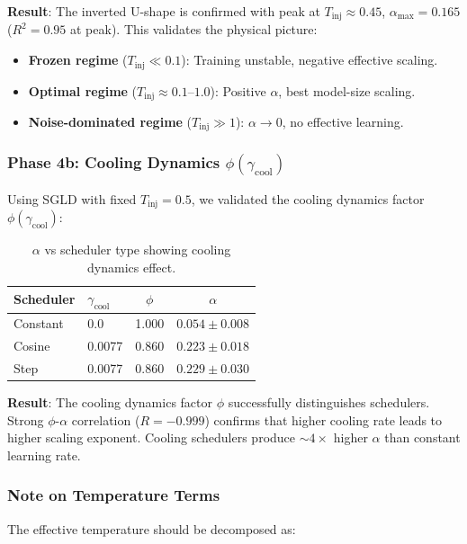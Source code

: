 \documentclass[11pt, a4paper]{article}
\theoremstyle{definition}
\begin{document}
\textbf{Result}: The inverted U-shape is confirmed with peak at $T_{\text{inj}} \approx 0.45$, $\alpha_{\text{max}} = 0.165$ ($R^2 = 0.95$ at peak). This validates the physical picture:
\begin{itemize}
    \item \textbf{Frozen regime} ($T_{\text{inj}} \ll 0.1$): Training unstable, negative effective scaling.
    \item \textbf{Optimal regime} ($T_{\text{inj}} \approx 0.1$--$1.0$): Positive $\alpha$, best model-size scaling.
    \item \textbf{Noise-dominated regime} ($T_{\text{inj}} \gg 1$): $\alpha \to 0$, no effective learning.
\end{itemize}

\subsubsection{Phase 4b: Cooling Dynamics $\phi(\gamma_{\text{cool}})$}

Using SGLD with fixed $T_{\text{inj}} = 0.5$, we validated the cooling dynamics factor $\phi(\gamma_{\text{cool}})$:

\begin{table}[htbp]
\centering
\caption{$\alpha$ vs scheduler type showing cooling dynamics effect.}
\label{tab:cool_scaling}
\begin{tabular}{@{}llcc@{}}
\toprule
\textbf{Scheduler} & $\gamma_{\text{cool}}$ & $\phi$ & $\alpha$ \\
\midrule
Constant & 0.0 & 1.000 & $0.054 \pm 0.008$ \\
Cosine & 0.0077 & 0.860 & $0.223 \pm 0.018$ \\
Step & 0.0077 & 0.860 & $0.229 \pm 0.030$ \\
\bottomrule
\end{tabular}
\end{table}

\textbf{Result}: The cooling dynamics factor $\phi$ successfully distinguishes schedulers. Strong $\phi$-$\alpha$ correlation ($R = -0.999$) confirms that higher cooling rate leads to higher scaling exponent. Cooling schedulers produce $\sim 4\times$ higher $\alpha$ than constant learning rate.

\subsubsection{Note on Temperature Terms}

The effective temperature should be decomposed as:
\end{document}
